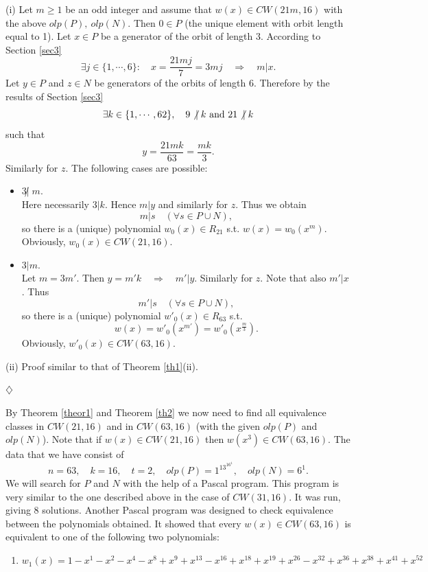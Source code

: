 {{{\begin{enumerate}
\begin{pr}
{(i)     Let $m \geq 1$ be an odd integer and assume that $w(x) \in CW(21m,16)$ with the above $olp(P), \ olp(N)$.
	Then $0 \in P$ (the unique element with orbit length equal to 1).  
	Let $ x \in P$ be a generator of the orbit of length 3. 
	According to Section \ref{sec3} 
	  $$ \exists  j \in \{1,\cdots,6\} : \quad x=\frac{21mj}{7}=3mj \quad \Rightarrow \quad m | x.$$
	Let $y \in P$ and $z \in N$ be generators of the orbits of length 6. 
	Therefore by the results of Section \ref{sec3}
	  $$ \exists k \in \{1, \cdots, 62\}, \quad 9 \not| \; k \ {\rm and} \ 21 \not| \; k $$
	such that
			$$ y=\frac{21mk}{63}=\frac{mk}{3}.$$       
       Similarly for $z$. 
       The following cases are possible: 
       \begin{itemize}
	   \item $3 \not| \; m$.\\ 
	     Here necessarily $3 | k$.                  
	     Hence $m | y$ and similarly for $z$. Thus we obtain 
		$$m|s \quad (\forall s \in P \cup N),$$ 
	     so
	     there is a (unique) polynomial $w_0(x) \in {R}_{21}$ s.t. 
		$w(x)=w_0(x^m)$.
	     Obviously, $w_0(x) \in CW(21,16)$.
	   \item $3 | m$.\\
	     Let $m=3m'$. Then $ y=m'k \quad \Rightarrow \quad m' | y.$   
	     Similarly for $z$. Note that also $m' | x$. Thus 
	      $$m'|s \quad  (\forall s \in P \cup N),$$
	     so there is a (unique) polynomial $w'_0(x) \in {R}_{63}$ s.t. 
		$$ w(x)=w'_0(x^{m'})=w'_0(x^{\frac{m}{3}}).$$
	     Obviously, $w'_0(x) \in CW(63,16)$.

	\end{itemize}

(ii)    Proof similar to that of Theorem \ref{th1}(ii). 
		   \begin{flushright}
				$\diamondsuit$
		   \end{flushright}
}
\end{pr}     
     
	 By Theorem \ref{theor1} and Theorem \ref{th2} 
	 we now need to find all equivalence classes in $CW(21,16)$ and 
	 in $CW(63,16)$ (with the given $olp(P)$ and $olp(N)$). Note that if 
	 $w(x) \in CW(21,16)$ then $w(x^3) \in CW(63,16)$.  
	 The data that we have consist of 
		$$n=63, \quad k=16, \quad t=2, \quad olp(P)=1^13^16^1, \quad olp(N)=6^1.$$ 
	 We will search for $P$ and $N$ with the help of a Pascal program.               
	 This program is very similar to the one 
	 described above in the case of $CW(31,16)$. It was run, giving 8 
	 solutions. Another Pascal program was designed to check equivalence 
	 between the polynomials obtained. It showed that every $w(x) \in CW(63,16)$  
	 is equivalent to one of the following two polynomials: 
	 \begin{enumerate}
	\item $w_{1}(x)=1-x^{1}-x^{2}-x^{4}-x^{8}+x^{9}+x^{13}-x^{16}+x^{18}+x^{19}+x^{26}-x^{32}+x^{36}+x^{38}+x^{41}+x^{52} $
	

\end{enumerate}
\end{enumerate}}}}
